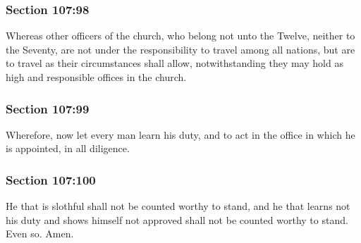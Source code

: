 	\subsubsection{Section 107:98} %
		\label{DC107-98}

		Whereas other officers of the church, who belong not unto the Twelve, neither to the Seventy, are not under the responsibility to travel among all nations, but are to travel as their circumstances shall allow, notwithstanding they may hold as high and responsible offices in the church.


	\subsubsection{Section 107:99} %
		\label{DC107-99}

		Wherefore, now let every man learn his duty, and to act in the office in which he is appointed, in all diligence.


	\subsubsection{Section 107:100} %
		\label{DC107-100}

		He that is slothful shall not be counted worthy to stand, and he that learns not his duty and shows himself not approved shall not be counted worthy to stand. Even so. Amen.

